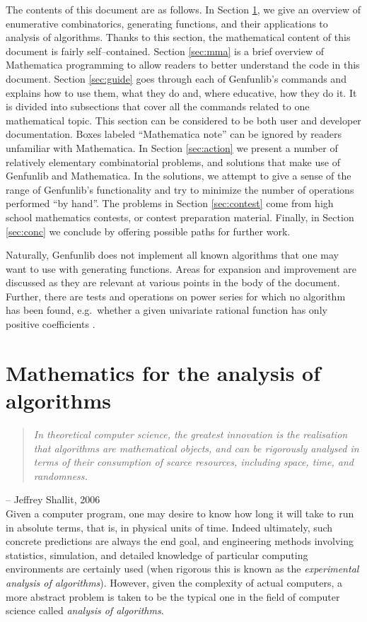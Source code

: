 \documentclass{article}
\theoremstyle{plain}
\begin{document}
The contents of this document are as follows.
In Section \ref{sec:aofa}, we give an overview of enumerative combinatorics,
generating functions, and their applications to analysis of algorithms.
Thanks to this section, the mathematical content of this document is fairly
self--contained.
Section \ref{sec:mma} is a brief overview of Mathematica programming to allow
readers to better understand the code in this document.
Section \ref{sec:guide} goes through each of Genfunlib's commands and explains
how to use them, what they do and, where educative, how they do it.
It is divided into subsections that cover all the commands related to one
mathematical topic.
This section can be considered to be both user and developer documentation.
Boxes labeled ``Mathematica note'' can be ignored by readers unfamiliar with
Mathematica.
In Section \ref{sec:action} we present a number of relatively elementary
combinatorial problems, and solutions
that make use of Genfunlib and Mathematica.
In the solutions, we attempt to give a sense of the range of Genfunlib's
functionality and try to minimize the number of operations performed
``by hand''.
The problems in Section \ref{sec:contest} come from high school mathematics
contests, or contest preparation material.
Finally, in Section \ref{sec:conc} we conclude by offering possible paths
for further work.

Naturally, Genfunlib does not implement all known algorithms that one may want
to use with generating functions.
Areas for expansion and improvement are discussed as they are relevant at
various points in the body of the document.
Further, there are tests and operations on power series for which no
algorithm has been found, e.g.\ whether a given univariate rational
function has only positive coefficients
\cite{kauers2007computer}.


\section{Mathematics for the analysis of algorithms} \label{sec:aofa}
\begin{quote}
  \emph{In theoretical computer science, the greatest
innovation is the realisation that algorithms are mathematical objects, and can
be rigorously analysed in terms of their consumption of scarce resources,
including space, time, and randomness.}
\end{quote}
\hfill -- Jeffrey Shallit, 2006 \cite{shal}\\

\noindent
Given a computer program, one may desire to know how long it will take to run in
absolute terms, that is, in physical units of time.
Indeed ultimately, such concrete predictions are always the end goal,
and engineering methods involving statistics, simulation, and detailed
knowledge of particular computing environments are certainly used
(when rigorous this is known as the \emph{experimental analysis of
algorithms}).
However, given the complexity of actual computers, a more abstract problem is
taken to be the typical one in the field of computer science called
\emph{analysis of algorithms}.
\end{document}
